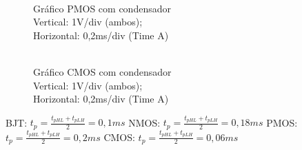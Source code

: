 \documentclass[pdftex,12pt,a4paper]{report}
\begin{document}
\begin{figure}[!htb]
  \centerline{}
  \caption{\\Gráfico PMOS com condensador \\Vertical: 1V/div (ambos); \\Horizontal: 0,2ms/div (Time A)}\label{bjt}
\endminipage\hfill
{}
  \centerline{}
  \caption{\\Gráfico CMOS com condensador \\Vertical: 1V/div (ambos); \\Horizontal: 0,2ms/div (Time A) }\label{fig:nmos}
\endminipage\hfill
\end{figure}

\newpage
BJT:
$t_p = \frac{t_{pHL}+t_{pLH}}{2} = 0,1 ms$
\newline\newline
NMOS:
$t_p = \frac{t_{pHL}+t_{pLH}}{2} = 0,18 ms$
\newline\newline
PMOS:
$t_p = \frac{t_{pHL}+t_{pLH}}{2} = 0,2 ms$
\newline\newline
CMOS:
$t_p = \frac{t_{pHL}+t_{pLH}}{2} = 0,06 ms$
\vspace{0.4cm}
\end{document}
